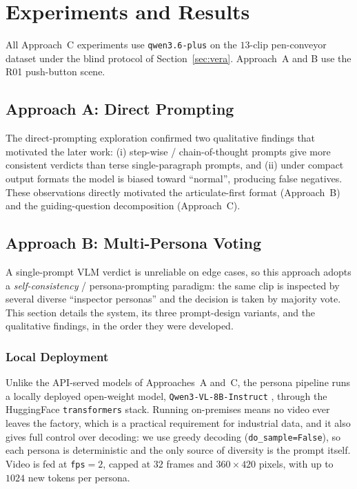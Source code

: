 \chapter{Experiments and Results}
\label{chap:results}

All Approach~C experiments use \texttt{qwen3.6-plus} on the $13$-clip pen-conveyor
dataset under the blind protocol of Section~\ref{sec:vera}. Approach~A and B use the
R01 push-button scene.

\section{Approach A: Direct Prompting}
The direct-prompting exploration confirmed two qualitative findings that motivated the
later work: (i) step-wise / chain-of-thought prompts give more consistent verdicts than
terse single-paragraph prompts, and (ii) under compact output formats the model is
biased toward ``normal'', producing false negatives. These observations directly
motivated the articulate-first format (Approach~B) and the guiding-question
decomposition (Approach~C).

\section{Approach B: Multi-Persona Voting}
A single-prompt VLM verdict is unreliable on edge cases, so this approach adopts a
\emph{self-consistency} / persona-prompting paradigm: the same clip is inspected by
several diverse ``inspector personas'' and the decision is taken by majority vote. This
section details the system, its three prompt-design variants, and the qualitative
findings, in the order they were developed.

\subsection{Local Deployment}
Unlike the API-served models of Approaches~A and~C, the persona pipeline runs a locally
deployed open-weight model, \texttt{Qwen3-VL-8B-Instruct} \cite{qwen3}, through the HuggingFace
\texttt{transformers} stack. Running on-premises means no video ever leaves the factory,
which is a practical requirement for industrial data, and it also gives full control over
decoding: we use greedy decoding (\texttt{do\_sample=False}), so each persona is
deterministic and the only source of diversity is the prompt itself. Video is fed at
\texttt{fps}$=2$, capped at $32$ frames and $360\times420$ pixels, with up to $1024$ new
tokens per persona.

